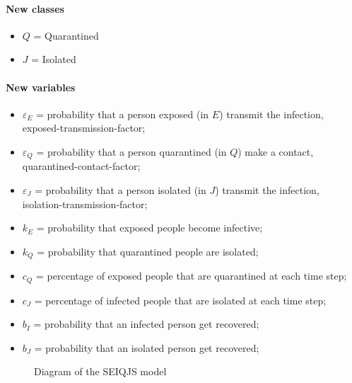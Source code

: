 \documentclass[12pt]{llncs}
\begin{document}
\paragraph{New classes}
\begin{itemize}
\item $Q$ = Quarantined
\item $J$ = Isolated
\end{itemize}

\paragraph{New variables}
\begin{itemize}
\item $\varepsilon_E$ = probability that a person exposed (in $E$) transmit the infection, exposed-transmission-factor;
\item $\varepsilon_Q$ = probability that a person quarantined (in $Q$) make a contact, quarantined-contact-factor;
\item $\varepsilon_J$ = probability that a person isolated (in $J$) transmit the infection, isolation-transmission-factor;
\item $k_E$ = probability that exposed people become infective;
\item $k_Q$ = probability that quarantined people are isolated;
\item $c_Q$ = percentage of exposed people that are quarantined at each time step;
\item $c_J$ = percentage of infected people that are isolated at each time step;
\item $b_I$ = probability that an infected person get recovered;
\item $b_J$ = probability that an isolated person get recovered;
\end{itemize}

\begin{figure}[H]
	\centering
    \caption{Diagram of the SEIQJS model}
\end{figure}
\end{document}
